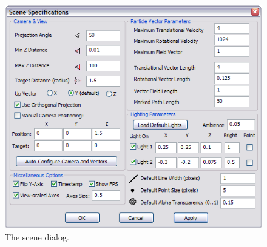 \begin{figure}[htb]
	\centering
	\includegraphics[width=4.5in]{figures/scene-dialog.png}
	\caption[The scene dialog]{The scene dialog.}
	\label{scene-dialog}
\end{figure}

